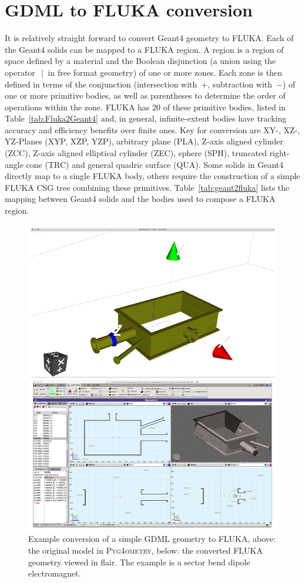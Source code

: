 \documentclass[final,5p,times,twocolumn]{elsarticle}
\newcommand{\PYGEOMETRY}{\textsc{Pyg4ometry}}
\begin{document}
\section{GDML to FLUKA conversion}
It is relatively straight forward to convert Geant4 geometry to FLUKA. Each
of the Geant4 solids can be mapped to a FLUKA region.  A region is a region
of space defined by a material and the Boolean disjunction (a union using
the operator~$\:|\:$ in free format geometry) of one or more
zones. Each zone is then defined in terms of the conjunction (intersection
with~$+$, subtraction with~$-$) of one or more primitive bodies, as well as
parentheses to determine the order of operations within the zone.  FLUKA
has 20 of these primitive bodies, listed in Table~\ref{tab:Fluka2Geant4}
and, in general, infinite-extent bodies have tracking accuracy and
efficiency benefits over finite ones. Key for conversion are XY-, XZ-,
YZ-Planes (XYP, XZP, YZP), arbitrary plane (PLA), Z-axis aligned cylinder
(ZCC), Z-axis aligned elliptical cylinder (ZEC), sphere (SPH), truncated
right-angle cone (TRC) and general quadric surface (QUA). Some solids in
Geant4 directly map to a single FLUKA body, others require the construction
of a simple FLUKA CSG tree combining these
primitives. Table~\ref{tab:geant2fluka} lists the mapping between Geant4
solids and the bodies used to compose a FLUKA region.
\begin{figure}
\begin{center}
\includegraphics[width=0.9\columnwidth]{./model-scene/CuboidalChamber.pdf}
\caption{Example conversion of a simple GDML geometry to FLUKA, above:
the original model in \PYGEOMETRY{}, below: the converted FLUKA geometry
viewed in flair. The example is a sector bend dipole electromagnet.}
\label{fig:gdml-flair}
\end{center}
\end{figure}
\end{document}
